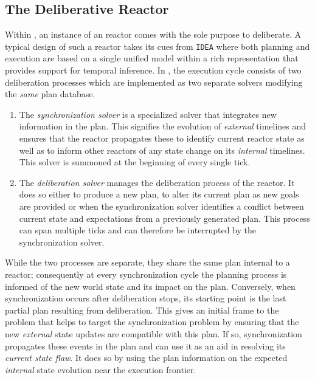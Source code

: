 \subsection{The  Deliberative Reactor}
\label{sec:arch:europa}

Within \rxe, an instance of an \eu reactor comes with the sole purpose
to deliberate. A typical design of such a reactor takes its cues from
\texttt{IDEA} \cite{mus02, mus06} where both planning and execution
are based on a single unified model within a rich representation that
provides support for temporal inference. In \rxe, the execution cycle
consists of two deliberation processes which are implemented as two
separate \eu solvers modifying the \emph{same} plan database.

\begin{enumerate}

\item The \emph{synchronization solver} is a specialized \eu solver
  that integrates new information in the plan. This signifies the
  evolution of \emph{external} timelines and ensures that the reactor
  propagates these to identify current reactor state as well as to
  inform other reactors of any state change on its \emph{internal}
  timelines. This solver is summoned at the beginning of every single
  tick.

\item The \emph{deliberation solver} manages the deliberation process
  of the reactor. It does so either to produce a new plan, to alter
  its current plan as new goals are provided or when the
  synchronization solver identifies a conflict between current state
  and expectations from a previously generated plan. This process can
  span multiple ticks and can therefore be interrupted by the
  synchronization solver.

\end{enumerate}

While the two processes are separate, they share the same plan
internal to a reactor; consequently at every synchronization cycle the
planning process is informed of the new world state and its impact on
the plan. Conversely, when synchronization occurs after deliberation
stops, its starting point is the last partial plan resulting from
deliberation. This gives an initial frame to the problem that helps to
target the synchronization problem by ensuring that the new {\em
  external} state updates are compatible with this plan. If so,
synchronization propagates these events in the plan and can use it as
an aid in resolving its {\em current state flaw}. It does so by using
the plan information on the expected {\em internal} state evolution
near the execution frontier.

